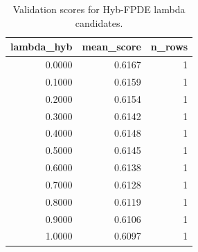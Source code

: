 \begin{table}[t]
\caption{Validation scores for Hyb-FPDE lambda candidates.}
\label{tab:lambda_distribution_computed}
\centering
\begin{tabular}{rrr}
\toprule
lambda\_hyb & mean\_score & n\_rows \\
\midrule
0.0000 & 0.6167 & 1 \\
0.1000 & 0.6159 & 1 \\
0.2000 & 0.6154 & 1 \\
0.3000 & 0.6142 & 1 \\
0.4000 & 0.6148 & 1 \\
0.5000 & 0.6145 & 1 \\
0.6000 & 0.6138 & 1 \\
0.7000 & 0.6128 & 1 \\
0.8000 & 0.6119 & 1 \\
0.9000 & 0.6106 & 1 \\
1.0000 & 0.6097 & 1 \\
\bottomrule
\end{tabular}

\end{table}
